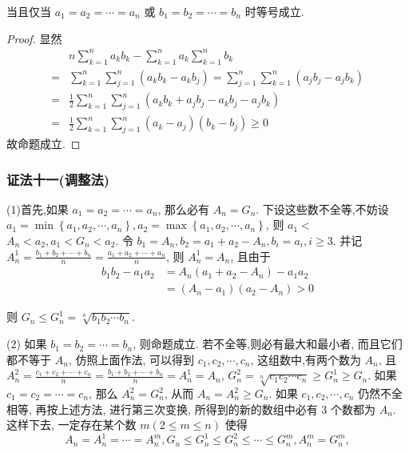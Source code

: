 当且仅当 $a_{1}=a_{2}=\cdots=a_{n}$ 或 $b_{1}=b_{2}=\cdots=b_{n}$ 时等号成立.

\begin{proof}
显然
$$
\begin{aligned}
& n \sum_{k=1}^{n} a_{k} b_{k}-\sum_{k=1}^{n} a_{k} \sum_{k=1}^{n} b_{k} \\
= & \sum_{k=1}^{n} \sum_{j=1}^{n}\left(a_{k} b_{k}-a_{k} b_{j}\right)=\sum_{j=1}^{n} \sum_{k=1}^{n}\left(a_{j} b_{j}-a_{j} b_{k}\right) \\
= & \frac{1}{2} \sum_{k=1}^{n} \sum_{j=1}^{n}\left(a_{k} b_{k}+a_{j} b_{j}-a_{k} b_{j}-a_{j} b_{k}\right) \\
= & \frac{1}{2} \sum_{k=1}^{n} \sum_{j=1}^{n}\left(a_{k}-a_{j}\right)\left(b_{k}-b_{j}\right) \geqslant 0
\end{aligned}
$$
故命题成立.
\end{proof}

\subsubsection*{证法十一(调整法)}

(1)首先,如果 $a_{1}=a_{2}=\cdots=a_{n}$, 那么必有 $A_{n}=G_{n}$. 下设这些数不全等,不妨设 $a_{1}=\min \left\{a_{1}, a_{2}, \cdots, a_{n}\right\}, a_{2}=\max \left\{a_{1}, a_{2}, \cdots, a_{n}\right\}$, 则 $a_{1}<$ $A_{n}<a_{2}, a_{1}<G_{n}<a_{2}$. 令 $b_{1}=A_{n}, b_{2}=a_{1}+a_{2}-A_{n}, b_{i}=a_{i}, i \geqslant 3$. 并记 $A_{n}^{1}=\frac{b_{1}+b_{2}+\cdots+b_{n}}{n}=\frac{a_{1}+a_{2}+\cdots+a_{n}}{n}$, 则 $A_{n}^{1}=A_{n}$, 且由于
$$
\begin{aligned}
b_{1} b_{2}-a_{1} a_{2} & =A_{n}\left(a_{1}+a_{2}-A_{n}\right)-a_{1} a_{2} \\
& =\left(A_{n}-a_{1}\right)\left(a_{2}-A_{n}\right)>0
\end{aligned}
$$

则 $G_{n} \leqslant G_{n}^{1}=\sqrt[n]{b_{1} b_{2} \cdots b_{n}}$.

(2) 如果 $b_{1}=b_{2}=\cdots=b_{n}$, 则命题成立. 若不全等,则必有最大和最小者, 而且它们都不等于 $A_{n}$, 仿照上面作法, 可以得到 $c_{1}, c_{2}, \cdots, c_{n}$, 这组数中,有两个数为 $A_{n}$, 且 $A_{n}^{2}=\frac{c_{1}+c_{2}+\cdots+c_{n}}{n}=\frac{b_{1}+b_{2}+\cdots+b_{n}}{n}=A_{n}^{1}=A_{n}$, $G_{n}^{2}=\sqrt[n]{c_{1} c_{2} \cdots c_{n}} \geqslant G_{n}^{1} \geqslant G_{n}$. 如果 $c_{1}=c_{2}=\cdots=c_{n}$, 那么 $A_{n}^{2}=G_{n}^{2}$, 从而 $A_{n}=A_{n}^{2} \geqslant G_{n}$. 如果 $c_{1}, c_{2}, \cdots, c_{n}$ 仍然不全相等, 再按上述方法, 进行第三次变换, 所得到的新的数组中必有 3 个数都为 $A_{n}$. 这样下去, 一定存在某个数 $m(2 \leqslant m \leqslant n)$ 使得
$$
A_{n}=A_{n}^{1}=\cdots=A_{n}^{m}, G_{n} \leqslant G_{n}^{1} \leqslant G_{n}^{2} \leqslant \cdots \leqslant G_{n}^{m}, A_{n}^{m}=G_{n}^{m},
$$

